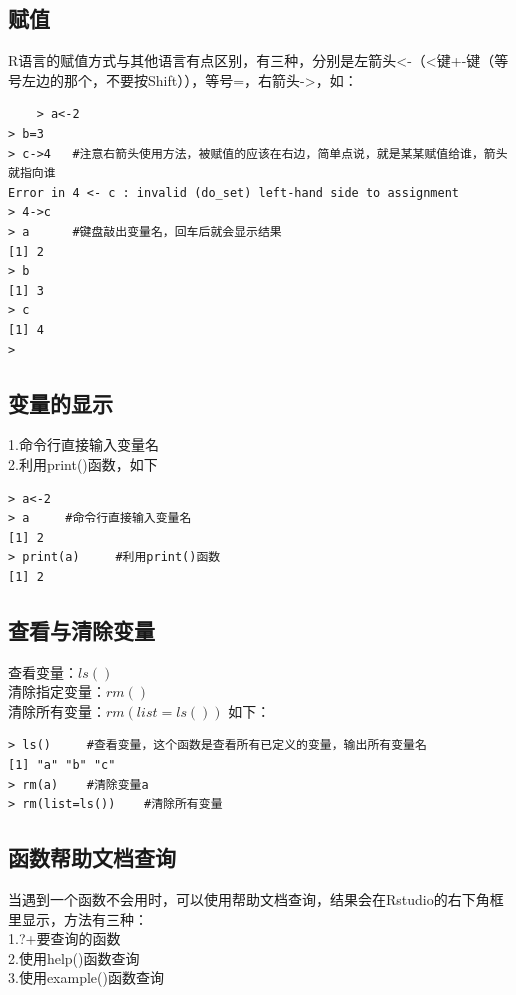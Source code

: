 \subsection{赋值}
R语言的赋值方式与其他语言有点区别，有三种，分别是左箭头<-（<键+-键（等号左边的那个，不要按Shift）），等号=，右箭头->，如：
\begin{lstlisting}
    > a<-2
> b=3
> c->4   #注意右箭头使用方法，被赋值的应该在右边，简单点说，就是某某赋值给谁，箭头就指向谁
Error in 4 <- c : invalid (do_set) left-hand side to assignment
> 4->c
> a      #键盘敲出变量名，回车后就会显示结果
[1] 2
> b
[1] 3
> c
[1] 4
>
\end{lstlisting}

\subsection{变量的显示}
1.命令行直接输入变量名\\

2.利用print()函数，如下
\begin{lstlisting}
> a<-2
> a     #命令行直接输入变量名
[1] 2
> print(a)     #利用print()函数
[1] 2
\end{lstlisting}

\subsection{查看与清除变量}
查看变量：$ls()$\\

清除指定变量：$rm()$\\

清除所有变量：$rm(list=ls())$ 如下：
\begin{lstlisting}
> ls()     #查看变量，这个函数是查看所有已定义的变量，输出所有变量名
[1] "a" "b" "c"
> rm(a)    #清除变量a
> rm(list=ls())    #清除所有变量 
\end{lstlisting}

\subsection{函数帮助文档查询}
当遇到一个函数不会用时，可以使用帮助文档查询，结果会在Rstudio的右下角框里显示，方法有三种：\\

1.?+要查询的函数\\

2.使用help()函数查询\\

3.使用example()函数查询\\

